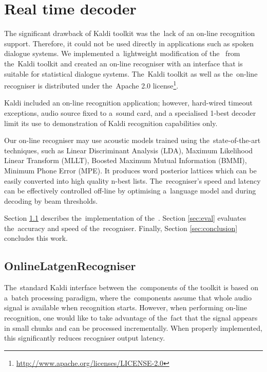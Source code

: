 \chapter{Real time decoder}
\label{cha:decoder}

The significant drawback of Kaldi toolkit was the~lack of an on-line recognition support.
Therefore, it could not be used directly in applications such as spoken dialogue systems.
We implemented a~lightweight modification of the~ from the~Kaldi toolkit and created an on-line recogniser with an interface that is suitable for statistical dialogue systems.
The~Kaldi toolkit as well as the~on-line recogniser is distributed under the~Apache 2.0 license\footnote{\url{http://www.apache.org/licenses/LICENSE-2.0}}.

Kaldi included an on-line recognition application; however, hard-wired timeout exceptions, audio source fixed to a~sound card, and a specialised 1-best decoder limit its use to demonstration of Kaldi recognition capabilities only.

Our on-line recogniser may use acoustic models trained using the~state-of-the-art techniques, 
such as Linear Discriminant Analysis (LDA), Maximum Likelihood Linear Transform (MLLT), Boosted Maximum Mutual Information (BMMI), Minimum Phone Error (MPE).
It produces word posterior lattices which can be easily converted into high quality n-best lists.
The~recogniser's speed and latency can be effectively controlled off-line by optimising a~language model and during decoding by beam thresholds.

Section \ref{sec:impl} describes the~implementation of the~.
Section \ref{sec:eval} evaluates the~accuracy and speed of the~recogniser.
Finally, Section \ref{sec:conclusion} concludes this work.

\section{OnlineLatgenRecogniser}
\label{sec:impl}

The~standard Kaldi interface between the~components of the toolkit is based on a~batch processing paradigm, where the~components assume that whole audio signal is available when recognition starts.
However, when performing on-line recognition, one would like to take advantage of the~fact that the signal appears in small chunks and can be processed incrementally.
When properly implemented, this significantly reduces recogniser output latency.


